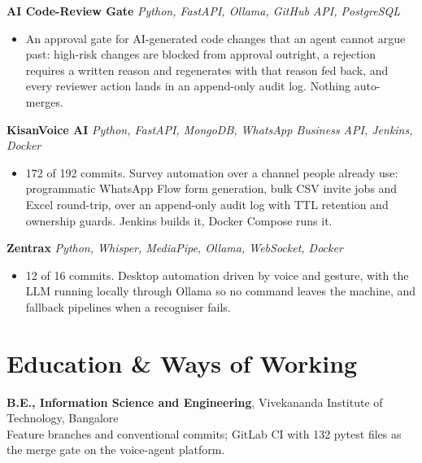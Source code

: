 \documentclass[10pt,a4paper]{article}
\begin{document}
\vspace{1pt}
\textbf{AI Code-Review Gate} \textit{Python, FastAPI, Ollama, GitHub API, PostgreSQL}
\begin{itemize}
  \item An approval gate for AI-generated code changes that an agent cannot argue past: high-risk
        changes are blocked from approval outright, a rejection requires a written reason and
        regenerates with that reason fed back, and every reviewer action lands in an append-only
        audit log. Nothing auto-merges.
\end{itemize}

\vspace{1pt}
\textbf{KisanVoice AI} \textit{Python, FastAPI, MongoDB, WhatsApp Business API, Jenkins, Docker}
\begin{itemize}
  \item 172 of 192 commits. Survey automation over a channel people already use: programmatic
        WhatsApp Flow form generation, bulk CSV invite jobs and Excel round-trip, over an append-only
        audit log with TTL retention and ownership guards. Jenkins builds it, Docker Compose runs it.
\end{itemize}

\vspace{1pt}
\textbf{Zentrax} \textit{Python, Whisper, MediaPipe, Ollama, WebSocket, Docker}
\begin{itemize}
  \item 12 of 16 commits. Desktop automation driven by voice and gesture, with the LLM running
        locally through Ollama so no command leaves the machine, and fallback pipelines when a
        recogniser fails.
\end{itemize}

\section{Education \& Ways of Working}
\textbf{B.E., Information Science and Engineering}, Vivekananda Institute of Technology, Bangalore\\
Feature branches and conventional commits; GitLab CI with 132 pytest files as the merge gate on the
voice-agent platform.
\end{document}
